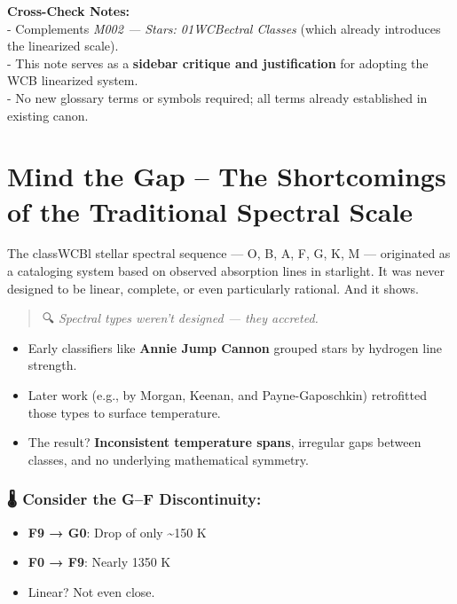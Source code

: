 \documentclass[
  letterpaper,
]{book}
\providecommand{\tightlist}{%
  \setlength{\itemsep}{0pt}\setlength{\parskip}{0pt}}
\begin{document}
\textbf{Cross-Check Notes:}\\
- Complements \emph{M002 --- Stars: 01WCBectral Classes} (which already
introduces the linearized scale).\\
- This note serves as a \textbf{sidebar critique and justification} for
adopting the WCB linearized system.\\
- No new glossary terms or symbols required; all terms already
established in existing canon.

\chapter{Mind the Gap -- The Shortcomings of the Traditional Spectral
Scale}\label{mind-the-gap-the-shortcomings-of-the-traditional-spectral-scale}

The classWCBl stellar spectral sequence --- O, B, A, F, G, K, M ---
originated as a cataloging system based on observed absorption lines in
starlight. It was never designed to be linear, complete, or even
particularly rational. And it shows.

\begin{quote}
🔍 \emph{Spectral types weren't designed --- they accreted.}
\end{quote}

\begin{itemize}
\tightlist
\item
  Early classifiers like \textbf{Annie Jump Cannon} grouped stars by
  hydrogen line strength.
\item
  Later work (e.g., by Morgan, Keenan, and Payne-Gaposchkin) retrofitted
  those types to surface temperature.
\item
  The result? \textbf{Inconsistent temperature spans}, irregular gaps
  between classes, and no underlying mathematical symmetry.
\end{itemize}

\subsection{🌡️ Consider the G--F
Discontinuity:}\label{consider-the-gf-discontinuity}

\begin{itemize}
\tightlist
\item
  \textbf{F9 → G0}: Drop of only \textasciitilde150 K
\item
  \textbf{F0 → F9}: Nearly 1350 K
\item
  Linear? Not even close.
\end{itemize}
\end{document}
